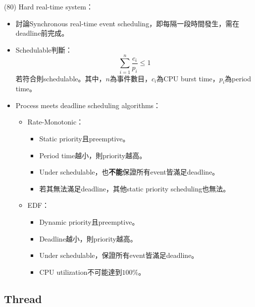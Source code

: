 \begin{theorem}{(80)} Hard real-time system：\begin{itemize}
        \item 討論Synchronous real-time event scheduling，即每隔一段時間發生，需在deadline前完成。
        \item Schedulable判斷：\begin{equation}
            \sum_{i = 1}^{n} \frac{c_i}{p_i} \le 1
        \end{equation} 若符合則schedulable。其中，$n$為事件數目，$c_i$為CPU burst time，$p_i$為period time。
        \item Process meets deadline scheduling algorithms：\begin{itemize}
            \item Rate-Monotonic：\begin{itemize}
                \item Static priority且preemptive。
                \item Period time越小，則priority越高。
                \item Under schedulable，也\textbf{不能}保證所有event皆滿足deadline。
                \item 若其無法滿足deadline，其他static priority scheduling也無法。
            \end{itemize}
            \item EDF：\begin{itemize}
                \item Dynamic priority且preemptive。
                \item Deadline越小，則priority越高。
                \item Under schedulable，保證所有event皆滿足deadline。
                \item CPU utilization不可能達到$100\%$。
            \end{itemize}
        \end{itemize}
    \end{itemize}
\end{theorem}

\subsection{Thread}

